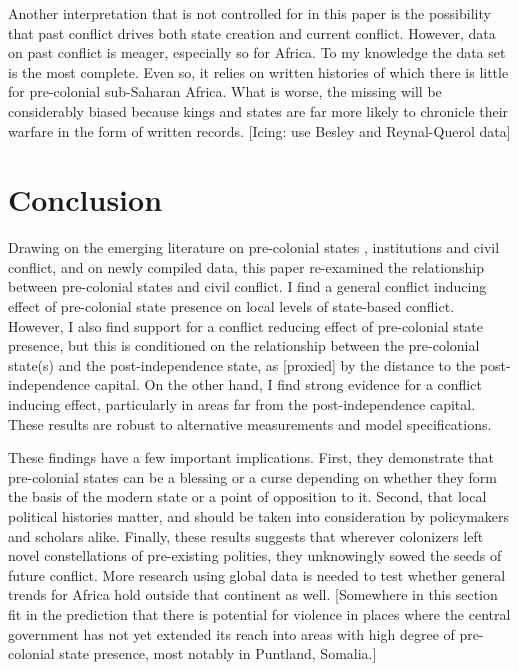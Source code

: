 \documentclass[12pt]{article}
\begin{document}
Another interpretation that is not controlled for in this paper is the
possibility that past conflict drives both state creation and current conflict.
However, data on past conflict is meager, especially so for Africa. To my
knowledge the \citet{Brecke1999} data set is the most complete. Even so, it
relies on written histories of which there is little for pre-colonial
sub-Saharan Africa. What is worse, the missing will be considerably biased
because kings and states are far more likely to chronicle their warfare in the
form of written records. [Icing: use Besley and Reynal-Querol data]

\section{Conclusion} \label{Conclusion}

Drawing on the emerging literature on pre-colonial states \citep{Paine2019,
Depetris-Chauvin2016}, institutions \citep{Wig2016, Englebert2002,
Michalopoulos2018} and civil conflict, and on newly compiled data, this paper
re-examined the relationship between pre-colonial states and civil conflict. I
find a general conflict inducing effect of pre-colonial state presence on local
levels of state-based conflict. However, I also find support for a conflict
reducing effect of pre-colonial state presence, but this is conditioned on the
relationship between the pre-colonial state(s) and the post-independence state,
as [proxied] by the distance to the post-independence capital. On the other
hand, I find strong evidence for a conflict inducing effect, particularly in
areas far from the post-independence capital. These results are robust to
alternative measurements and model specifications.

These findings have a few important implications. First, they demonstrate that
pre-colonial states can be a blessing or a curse depending on whether they form
the basis of the modern state or a point of opposition to it. Second, that local
political histories matter, and should be taken into consideration by
policymakers and scholars alike. Finally, these results suggests that wherever
colonizers left novel constellations of pre-existing polities, they unknowingly
sowed the seeds of future conflict. More research using global data is needed to
test whether general trends for Africa hold outside that continent as well.
[Somewhere in this section fit in the prediction that there is potential for
violence in places where the central government has not yet extended its reach
into areas with high degree of pre-colonial state presence, most notably in
Puntland, Somalia.]
\end{document}
